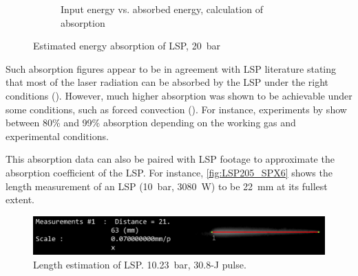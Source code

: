 \begin{figure}[h]
\begin{subfigure}[t]{0.47\textwidth}
                    \caption{Input energy vs. absorbed energy, calculation of absorption}
                    \label{fig:absorption_20bar}
                \end{subfigure}
                \caption{Estimated energy absorption of LSP, \qty{20}{bar}}
                \label{fig:LSP_absorption_data}
            \end{figure}

            Such absorption figures appear to be in agreement with LSP literature stating that most of the laser radiation can be absorbed by the LSP under the right conditions (\textcite{keeferLaserSustainedPlasmas1989}). However, much higher absorption was shown to be achievable under some conditions, such as forced convection (\textcite{fowlerIgnitionMaintenanceSubsonic1975}). For instance, experiments by \textcite{toyodaThrustPerformanceCW2002} show between 80\% and 99\% absorption depending on the working gas and experimental conditions.

            This absorption data can also be paired with LSP footage to approximate the absorption coefficient of the LSP. For instance, \autoref{fig:LSP205_SPX6} shows the length measurement of an LSP (\qty{10}{bar}, \qty{3080}{W}) to be \qty{22}{mm} at its fullest extent.

            \begin{figure}[h]
                \centering
                \includegraphics[width=\textwidth]{assets/5 results/LSP6_10.23_length.png}
                \caption[Length estimation of LSP]{Length estimation of LSP. \qty{10.23}{bar}, \num{30.8}-\unit{J} pulse. }
                \label{fig:LSP205_SPX6}
            \end{figure}

